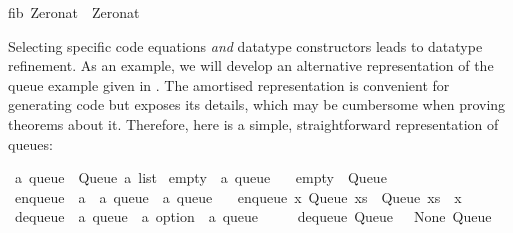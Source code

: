 \begin{isabellebody}
\begin{isamarkuptext}
fib\ Zero{\isacharunderscore}nat\ {\isacharequal}\ Zero{\isacharunderscore}nat{\isacharsemicolon}\isanewline%
\end{isamarkuptext}%
\isamarkuptrue%
%
\endisatagtypewriter
{\isafoldtypewriter}%
%
\isadelimtypewriter
%
\endisadelimtypewriter
%
\isamarkuptrue%
%
\begin{isamarkuptext}%
Selecting specific code equations \emph{and} datatype constructors
  leads to datatype refinement.  As an example, we will develop an
  alternative representation of the queue example given in
  .  The amortised representation is
  convenient for generating code but exposes its 
  details, which may be cumbersome when proving theorems about it.
  Therefore, here is a simple, straightforward representation of
  queues:%
\end{isamarkuptext}%
\isamarkuptrue%
%
\isadelimquote
%
\endisadelimquote
%
\isatagquote
{}\isamarkupfalse%
\ {\isacharprime}a\ queue\ {\isacharequal}\ Queue\ {\isachardoublequoteopen}{\isacharprime}a\ list{\isachardoublequoteclose}\isanewline
\isanewline
{}\isamarkupfalse%
\ empty\ {\isacharcolon}{\isacharcolon}\ {\isachardoublequoteopen}{\isacharprime}a\ queue{\isachardoublequoteclose}\ \isanewline
\ \ {\isachardoublequoteopen}empty\ {\isacharequal}\ Queue\ {\isacharbrackleft}{\isacharbrackright}{\isachardoublequoteclose}\isanewline
\isanewline
{}\isamarkupfalse%
\ enqueue\ {\isacharcolon}{\isacharcolon}\ {\isachardoublequoteopen}{\isacharprime}a\ {\isasymRightarrow}\ {\isacharprime}a\ queue\ {\isasymRightarrow}\ {\isacharprime}a\ queue{\isachardoublequoteclose}\ \isanewline
\ \ {\isachardoublequoteopen}enqueue\ x\ {\isacharparenleft}Queue\ xs{\isacharparenright}\ {\isacharequal}\ Queue\ {\isacharparenleft}xs\ {\isacharat}\ {\isacharbrackleft}x{\isacharbrackright}{\isacharparenright}{\isachardoublequoteclose}\isanewline
\isanewline
{}\isamarkupfalse%
\ dequeue\ {\isacharcolon}{\isacharcolon}\ {\isachardoublequoteopen}{\isacharprime}a\ queue\ {\isasymRightarrow}\ {\isacharprime}a\ option\ {\isasymtimes}\ {\isacharprime}a\ queue{\isachardoublequoteclose}\ \isanewline
\ \ \ \ {\isachardoublequoteopen}dequeue\ {\isacharparenleft}Queue\ {\isacharbrackleft}{\isacharbrackright}{\isacharparenright}\ {\isacharequal}\ {\isacharparenleft}None{\isacharcomma}\ Queue\ {\isacharbrackleft}{\isacharbrackright}{\isacharparenright}{\isachardoublequoteclose}\isanewline

\end{isabellebody}
